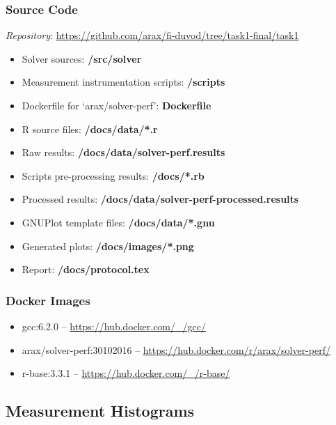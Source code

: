 \documentclass[a4paper,12pt]{article}
\begin{document}
\subsubsection*{Source Code}
\label{subsubsec:sources}
\textit{Repository}: \url{https://github.com/arax/fi-duvod/tree/task1-final/task1}
\begin{itemize}
    \item Solver sources: \textbf{/src/solver}
    \item Measurement instrumentation scripts: \textbf{/scripts}
    \item Dockerfile for `arax/solver-perf': \textbf{Dockerfile}

    \item R source files: \textbf{/docs/data/*.r}
    \item Raw results: \textbf{/docs/data/solver-perf.results}
    \item Scripts pre-processing results: \textbf{/docs/*.rb}
    \item Processed results: \textbf{/docs/data/solver-perf-processed.results}

    \item GNUPlot template files: \textbf{/docs/data/*.gnu}
    \item Generated plots: \textbf{/docs/images/*.png}
    \item Report: \textbf{/docs/protocol.tex}
\end{itemize}

\subsubsection*{Docker Images}
\label{subsubsec:docker}
\begin{itemize}
    \item gcc:6.2.0 -- \url{https://hub.docker.com/_/gcc/}
    \item arax/solver-perf:30102016 -- \url{https://hub.docker.com/r/arax/solver-perf/}
    \item r-base:3.3.1 -- \url{https://hub.docker.com/_/r-base/}
\end{itemize}

\pagebreak

\subsection{Measurement Histograms}
\label{subsec:histo}
\end{document}
